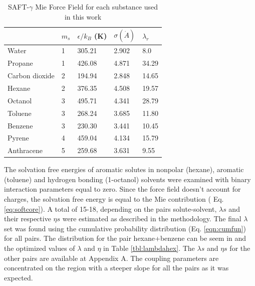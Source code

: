 \begin{table}[h]
\centering
  \caption{SAFT-$\gamma$ Mie Force Field for each substance used in this work}
  \label{tbl:parameters}
  \begin{tabular}{lllll}
  	\hline
  	               & $m_s$ & $\epsilon/k_{B}$ (K) & $\sigma (\dot{A})$ & $\lambda_r$ \\ \hline
  	Water          & 1     & 305.21               & 2.902              & 8.0         \\
  	Propane        & 1     & 426.08               & 4.871              & 34.29       \\
  	Carbon dioxide & 2     & 194.94               & 2.848              & 14.65       \\
  	Hexane         & 2     & 376.35               & 4.508              & 19.57       \\
  	Octanol        & 3     & 495.71               & 4.341              & 28.79       \\
  	Toluene        & 3     & 268.24               & 3.685              & 11.80       \\
  	Benzene        & 3     & 230.30               & 3.441              & 10.45       \\
  	Pyrene         & 4     & 459.04               & 4.134              & 15.79       \\
  	Anthracene     & 5     & 259.68               & 3.631              & 9.55        \\ \hline
  \end{tabular}

\end{table}

The solvation free energies of aromatic solutes in nonpolar (hexane), aromatic (toluene) and hydrogen bonding (1-octanol) solvents were examined with binary interaction parameters equal to zero. Since the force field doesn't account for charges, the solvation free energy is equal to the Mie contribution ( Eq. \eqref{eq:softcore}). A total of 15-18, depending on the pairs solute-solvent,  $\lambda s$ and their respective $\eta s$ were estimated as described in the methodology. The final $\lambda$ set was found using  
the cumulative probability distribution (Eq. \eqref{eqn:cumfun}) for all pairs. The distribution for the pair hexane+benzene can be seem in  and the optimized values of $\lambda$ and $\eta$ in Table \ref{tbl:lambdahex}. The $\lambda s$ and $\eta s$  for the other pairs are available at  Appendix A. The coupling parameters are concentrated on the region with a steeper slope for all the pairs  as it was expected.

